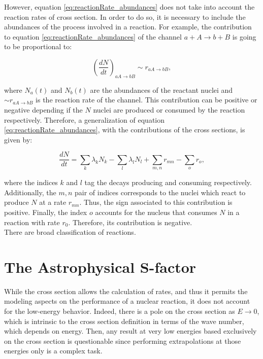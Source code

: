 \documentclass[openany]{book}
\begin{document}
However, equation \ref{eq:reactionRate_abundances} does not take into account the reaction rates of cross section. In order to do so, it is necessary to include the abundances of the process involved in a reaction. For example, the contribution to equation \ref{eq:reactionRate_abundances} of the channel $a + A \rightarrow b + B$ is going to be proportional to: 

\begin{equation}
		\left(\frac{dN}{dt}\right)_{aA \rightarrow bB} \sim r_{aA \rightarrow bB},
\end{equation}

where $N_a(t)$ and $N_b(t)$ are the abundances of the reactant nuclei and $ \sim r_{aA \rightarrow bB}$ is the reaction rate of the channel. This contribution can be positive or negative depending if the $N$ nuclei are produced or consumed by the reaction respectively. Therefore, a generalization of equation \ref{eq:reactionRate_abundances}, with the contributions of the cross sections, is given by: 

\begin{equation}\label{eq:reactionRate_abundances_general}
	\frac{dN}{dt} =  \sum_{k} {\lambda_k N_k}  - \sum_{l} {\lambda_l N_l} +  \sum_{m, n} {r_{mn}} - \sum_{o} {r_{o}},
\end{equation}

where the indices $k$ and $l$ tag the decays producing and consuming respectively. Additionally, the $m, n$ pair of indices corresponds to the nuclei which react to produce $N$ at a rate $r_{mn}$. Thus, the sign associated to this contribution is positive. Finally, the index $o$ accounts for the nucleus that consumes $N$ in a reaction with rate $r_0$. Therefore, its contribution is negative. \\

There are broad classification of reactions. 

\section{The Astrophysical S-factor} \label{sec:sFactor}

While the cross section allows the calculation of rates, and thus it permits the modeling aspects on the performance of a nuclear reaction, it does not account for the low-energy behavior. Indeed, there is a pole on the cross section as $E \rightarrow 0$, which is intrinsic to the cross section definition in terms of the wave number, which depends on energy. Then, any result at very low energies based exclusively on the cross section is questionable since performing extrapolations at those energies only is a complex task. \\
\end{document}
